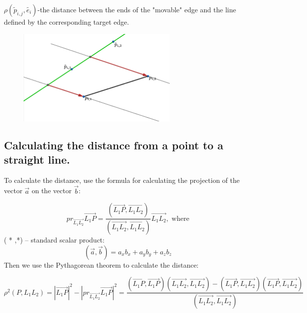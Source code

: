 \documentclass[11pt,fleqn,a4paper]{scrartcl}
\begin{document}
$\rho(\tilde p_{i,j},\widetilde{e_{i}})$-the distance between the ends of the "movable" edge and the line defined by the corresponding target edge.
\begin{figure}[htbp]
\centering
\includegraphics[width=0.7\textwidth]{distancce.png}
\end{figure}
\subsection{Calculating the distance from a point to a straight line.}
To calculate the distance, use the formula for calculating the projection of the vector $\overrightarrow{a}$ on the vector $\overrightarrow{b}$: \\
\begin{figure}
\end{figure}
$$pr_{\overrightarrow{L_{1}L_{2}}} \overrightarrow{L_{1}P}=\frac{( \overrightarrow{L_{1}P}, \overrightarrow{L_{1}L_{2}})}{ (\overrightarrow{L_{1}L_{2}}, \overrightarrow{L_{1}L_{2}})} \overrightarrow{L_{1}L_{2}},\text{ where}$$ ( * ,*) -- standard scalar product:
$$( \overrightarrow{a}, \overrightarrow{b})=a_{x}b_{x}+a_{y}b_{y}+a_{z}b_{z}$$
Then we use the Pythagorean theorem to calculate the distance:

$$\rho^{2}(P,L_1L_2)=|\overrightarrow{L_{1}P}|^{2}-|pr_{\overrightarrow{L_{1}L_{2}}} \overrightarrow{L_{1}P}|^{2}=\frac{(\overrightarrow{L_{1}P},\overrightarrow{L_{1}P})(\overrightarrow{L_{1}L_{2}},\overrightarrow{L_{1}L_{2}})-(\overrightarrow{L_{1}P},\overrightarrow{L_{1}L_{2}})(\overrightarrow{L_{1}P},\overrightarrow{L_{1}L_{2}})}{(\overrightarrow{L_{1}L_{2}},\overrightarrow{L_{1}L_{2}})}$$
\end{document}
